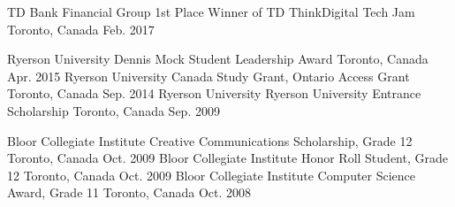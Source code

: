 \begin{cvhonors}
  \cvhonor
    {TD Bank Financial Group}
    {1st Place Winner of TD ThinkDigital Tech Jam}
    {Toronto, Canada}
    {Feb. 2017}
\end{cvhonors}

\begin{cvhonors}
  \cvhonor
    {Ryerson University}
    {Dennis Mock Student Leadership Award}
    {Toronto, Canada}
    {Apr. 2015}
  \cvhonor
    {Ryerson University}
    {Canada Study Grant, Ontario Access Grant}
    {Toronto, Canada}
    {Sep. 2014}
  \cvhonor
    {Ryerson University}
    {Ryerson University Entrance Scholarship}
    {Toronto, Canada}
    {Sep. 2009}
\end{cvhonors}

\begin{cvhonors}
  \cvhonor
    {Bloor Collegiate Institute}
    {Creative Communications Scholarship, Grade 12}
    {Toronto, Canada}
    {Oct. 2009}
  \cvhonor
    {Bloor Collegiate Institute}
    {Honor Roll Student, Grade 12}
    {Toronto, Canada}
    {Oct. 2009}
  \cvhonor
    {Bloor Collegiate Institute}
    {Computer Science Award, Grade 11}
    {Toronto, Canada}
    {Oct. 2008}
\end{cvhonors}
